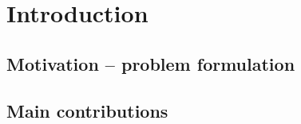 \chapter{Introduction}
\label{chapter:introduction}

\lipsum[1]


\section{Motivation – problem formulation}
\label{section:motivation}

\lipsum[1]


\section{Main contributions}
\label{section:contributions}

